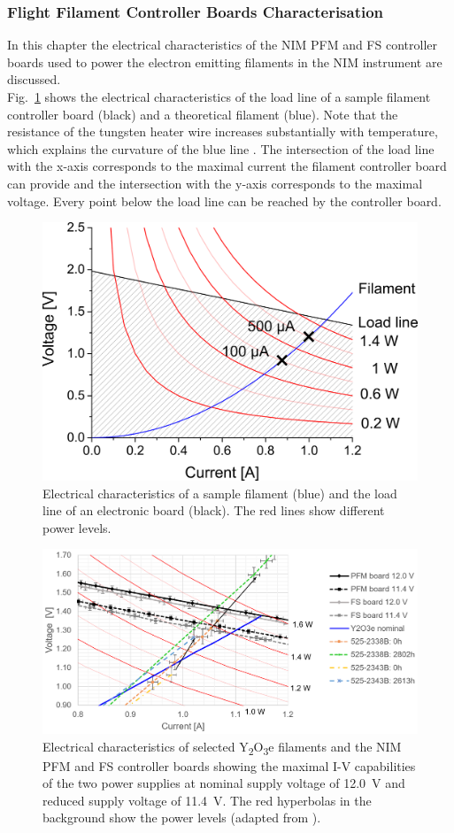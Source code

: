		\subsubsection{Flight Filament Controller Boards Characterisation}
		In this chapter the electrical characteristics of the NIM PFM and FS controller boards used to power the electron emitting filaments in the NIM instrument are discussed.\\
		Fig.~\ref{fig:FilSampGraph} shows the electrical characteristics of the load line of a sample filament controller board (black) and a theoretical filament (blue). Note that the resistance of the tungsten heater wire increases substantially with temperature, which explains the curvature of the blue line \cite{Wilthan_2005}. The intersection of the load line with the x-axis corresponds to the maximal current the filament controller board can provide and the intersection with the y-axis corresponds to the maximal voltage. Every point below the load line can be reached by the controller board. 
		\begin{figure}[H]
			\centering
			\includegraphics[width=.7\textwidth]{Bilder/Fil_SampGraph.png}
			\caption{Electrical characteristics of a sample filament (blue) and the load line of an electronic board (black). The red lines show different power levels.}
			\label{fig:FilSampGraph}
		\end{figure}
		\begin{figure}[H]
			\centering
			\includegraphics[width=\textwidth]{Bilder/Filament_RicosGraph.png}
			\caption{Electrical characteristics of selected Y\textsubscript{2}O\textsubscript{3}e filaments and the NIM PFM and FS controller boards showing the maximal I-V capabilities of the two power supplies at nominal supply voltage of 12.0~V and reduced supply voltage of 11.4~V. The red hyperbolas in the background show the power levels (adapted from \cite{Diss_Fausch}).}
			\label{fig:FilRico}
		\end{figure}
